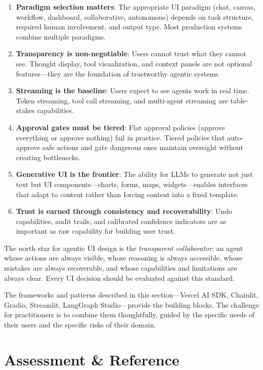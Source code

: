 \begin{enumerate}
  \item \textbf{Paradigm selection matters}: The appropriate UI paradigm (chat, canvas, workflow, dashboard, collaborative, autonomous) depends on task structure, required human involvement, and output type. Most production systems combine multiple paradigms.
  \item \textbf{Transparency is non-negotiable}: Users cannot trust what they cannot see. Thought display, tool visualization, and context panels are not optional features---they are the foundation of trustworthy agentic systems.
  \item \textbf{Streaming is the baseline}: Users expect to see agents work in real time. Token streaming, tool call streaming, and multi-agent streaming are table-stakes capabilities.
  \item \textbf{Approval gates must be tiered}: Flat approval policies (approve everything or approve nothing) fail in practice. Tiered policies that auto-approve safe actions and gate dangerous ones maintain oversight without creating bottlenecks.
  \item \textbf{Generative UI is the frontier}: The ability for LLMs to generate not just text but UI components---charts, forms, maps, widgets---enables interfaces that adapt to content rather than forcing content into a fixed template.
  \item \textbf{Trust is earned through consistency and recoverability}: Undo capabilities, audit trails, and calibrated confidence indicators are as important as raw capability for building user trust.
\end{enumerate}

\begin{keybox}
The north star for agentic UI design is the \emph{transparent collaborator}: an agent whose actions are always visible, whose reasoning is always accessible, whose mistakes are always recoverable, and whose capabilities and limitations are always clear. Every UI decision should be evaluated against this standard.
\end{keybox}

The frameworks and patterns described in this section---Vercel AI SDK, Chainlit, Gradio, Streamlit, LangGraph Studio---provide the building blocks. The challenge for practitioners is to combine them thoughtfully, guided by the specific needs of their users and the specific risks of their domain.

\part{Assessment \& Reference}

